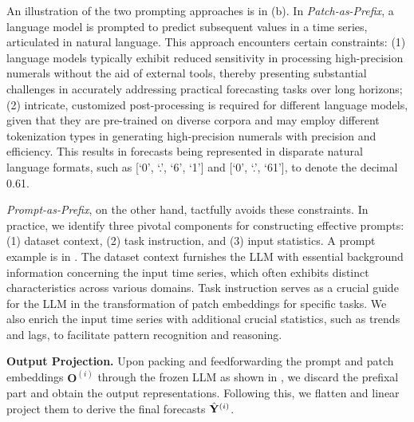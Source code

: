 An illustration of the two prompting approaches is in (b). In \textit{Patch-as-Prefix}, a language model is prompted to predict subsequent values in a time series, articulated in natural language. This approach encounters certain constraints: (1) language models typically exhibit reduced sensitivity in processing high-precision numerals without the aid of external tools, thereby presenting substantial challenges in accurately addressing practical forecasting tasks over long horizons; (2) intricate, customized post-processing is required for different language models, given that they are pre-trained on diverse corpora and may employ different tokenization types in generating high-precision numerals with precision and efficiency. This results in forecasts being represented in disparate natural language formats, such as [`0', `.', `6', `1'] and [`0', `.', `61'], to denote the decimal 0.61.

\textit{Prompt-as-Prefix}, on the other hand, tactfully avoids these constraints.
In practice, we identify three pivotal components for constructing effective prompts: (1) dataset context, (2) task instruction, and (3) input statistics. A prompt example is in . The dataset context furnishes the LLM with essential background information concerning the input time series, which often exhibits distinct characteristics across various domains. Task instruction serves as a crucial guide for the LLM in the transformation of patch embeddings for specific tasks. We also enrich the input time series with additional crucial statistics, such as trends and lags, to facilitate pattern recognition and reasoning.

\noindent\textbf{Output Projection.}
Upon packing and feedforwarding the prompt and patch embeddings $\mathbf{O}^{(i)}$ through the frozen LLM as shown in , we discard the prefixal part and obtain the output representations. Following this, we flatten and linear project them to derive the final forecasts $\Hat{\mathbf{Y}}^{(i)}$.
